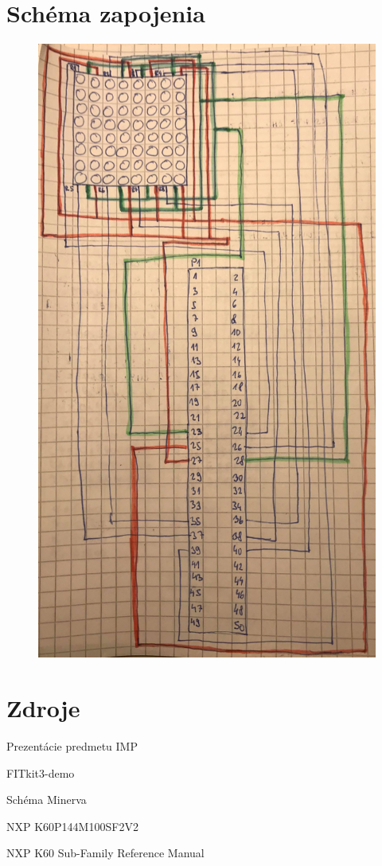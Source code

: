 \documentclass[a4paper,11pt]{article}
\begin{document}
\section{Schéma zapojenia}
\begin{figure}[h]
\vspace{5.0cm}
\centering
\includegraphics[scale=0.15]{foto.png}
\vspace{-10.0cm}
\end{figure}



\newpage
\newpage
\section{Zdroje}
\begin{compactitem}
\item Prezentácie predmetu IMP
\item FITkit3-demo
\item Schéma Minerva 
\item NXP K60P144M100SF2V2 
\item NXP K60 Sub-Family Reference Manual 
\end{compactitem}
\end{document}
